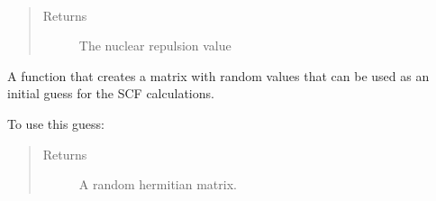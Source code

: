 \documentclass[letterpaper,10pt,english]{sphinxmanual}
\begin{document}
\begin{fulllineitems}
\begin{fulllineitems}
\begin{quote}
\begin{description}
\end{description}\end{quote}

\end{fulllineitems}


\begin{fulllineitems}
\label{\detokenize{Real_GHF:ghf.real_GHF.RealGHF.nuc_rep}}~\begin{quote}\begin{description}
\item[{Returns}] \leavevmode
The nuclear repulsion value

\end{description}\end{quote}

\end{fulllineitems}


\begin{fulllineitems}
\label{\detokenize{Real_GHF:ghf.real_GHF.RealGHF.random_guess}}
A function that creates a matrix with random values that can be used as an initial guess
for the SCF calculations.

To use this guess:

\begin{sphinxVerbatim}[commandchars=\\\{\}]
          
   
  
\end{sphinxVerbatim}
\begin{quote}\begin{description}
\item[{Returns}] \leavevmode
A random hermitian matrix.


\end{description}
\end{quote}
\end{fulllineitems}
\end{fulllineitems}
\end{document}
